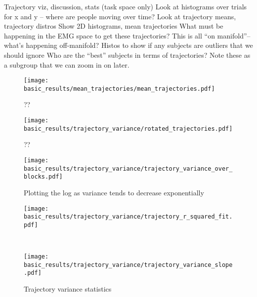 \documentclass[../main.tex]{subfiles}
\begin{document}
Trajectory viz, discussion, stats (task space only)
Look at histograms over trials for x and y – where are people moving over time?
Look at trajectory means, trajectory distros
Show 2D histograms, mean trajectories
What must be happening in the EMG space to get these trajectories?
This is all “on manifold”-- what’s happening off-manifold?
Histos to show if any subjects are outliers that we should ignore
Who are the “best” subjects in terms of trajectories? Note these as a subgroup that we can zoom in on later.


\begin{figure}[H]
    \centering
    \texttt{[image: basic\_results/mean\_trajectories/mean\_trajectories.pdf]}
    \caption[Mean trajectories]{??}\label{fig:mean_trajectories}
\end{figure}


\begin{figure}[H]
    \centering
    \texttt{[image: basic\_results/trajectory\_variance/rotated\_trajectories.pdf]}
    \caption[Rotating trajectories]{??}\label{fig:rotated_trajectories}
\end{figure}


\begin{figure}[H]
    \centering
    \texttt{[image: basic\_results/trajectory\_variance/trajectory\_variance\_over\_blocks.pdf]}
    \caption[Trajectory variance over blocks]{Plotting the log as variance tends to decrease exponentially}\label{fig:trajectory_variance}
\end{figure}


\begin{figure}[H]
    \centering
    \begin{minipage}{0.9\textwidth}
        \texttt{[image: basic\_results/trajectory\_variance/trajectory\_r\_squared\_fit.pdf]}
        \subcaption{}
    \end{minipage}\\%
    \begin{minipage}{0.9\textwidth}
        \texttt{[image: basic\_results/trajectory\_variance/trajectory\_variance\_slope.pdf]}
      \subcaption{}
    \end{minipage}
    \caption[Trajectory variance statistics]{Trajectory variance statistics}\label{fig:trajectory_variance_fits}
\end{figure}





\end{document}
